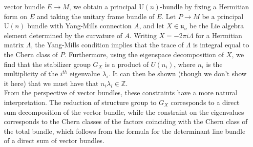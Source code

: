 \documentclass[psamsfonts, 12pt]{amsart}
\theoremstyle{definition}
\theoremstyle{remark}
\newcommand{\Z}{\mathbb{Z}}
\begin{document}
vector bundle $E \to M$, we obtain a principal $\mathrm{U}(n)$-bundle by fixing
a Hermitian form on $E$ and taking the unitary frame bundle of $E$. Let $P \to M$ be
a principal $\mathrm{U}(n)$ bundle with Yang-Mills connection $A$, and let
$X \in \mathfrak{u}_n$ be the Lie algebra element determined by the curvature of $A$.
Writing $X = -2\pi i \Lambda$ for a Hermitian matrix $\Lambda$, the Yang-Mills condition
implies that the trace of $\Lambda$ is integral equal to the Chern class of $P$.
Furthermore, using the eigenspace decomposition of $X$, we find that the stabilizer
group $G_X$ is a product of $U(n_i)$, where $n_i$ is the multiplicity of the
$i^{th}$ eigenvalue $\lambda_i$. It can then be shown (though we don't show it
here) that we must have that $n_i\lambda_i \in \Z$. \\

From the perspective of vector bundles, these constraints have a more natural
interpretation. The reduction of structure group to $G_X$ corresponds to a direct
sum decomposition of the vector bundle, while the constraint on the eigenvalues
corresponds to the Chern classes of the factors coinciding with the Chern class
of the total bundle, which follows from the formula for the determinant line bundle
of a direct sum of vector bundles.
%
\end{document}
